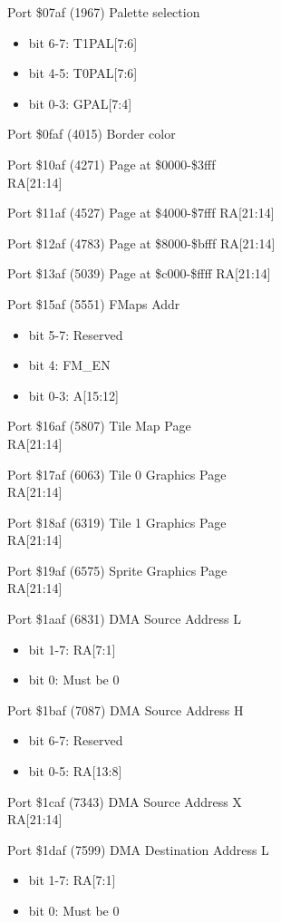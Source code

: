 Port \$07af (1967) Palette selection
\begin{itemize}
\item[] bit 6-7: T1PAL[7:6]
\item[] bit 4-5: T0PAL[7:6]
\item[] bit 0-3: GPAL[7:4]
\end{itemize}

Port \$0faf (4015) Border color

Port \$10af (4271) Page at \$0000-\$3fff\\
RA[21:14]

Port \$11af (4527) Page at \$4000-\$7fff
RA[21:14]

Port \$12af (4783) Page at \$8000-\$bfff
RA[21:14]

Port \$13af (5039) Page at \$c000-\$ffff
RA[21:14]

Port \$15af (5551) FMaps Addr
\begin{itemize}
\item[] bit 5-7: Reserved
\item[] bit 4: FM\_EN
\item[] bit 0-3: A[15:12]  
\end{itemize}

Port \$16af (5807) Tile Map Page\\
RA[21:14]

Port \$17af (6063) Tile 0 Graphics Page\\
RA[21:14]

Port \$18af (6319) Tile 1 Graphics Page\\
RA[21:14]

Port \$19af (6575) Sprite Graphics Page\\
RA[21:14]

Port \$1aaf (6831) DMA Source Address L
\begin{itemize}
\item[] bit 1-7: RA[7:1]
\item[] bit 0: Must be 0
\end{itemize}

Port \$1baf (7087) DMA Source Address H
\begin{itemize}
\item[] bit 6-7: Reserved
\item[] bit 0-5: RA[13:8]
\end{itemize}

Port \$1caf (7343) DMA Source Address X\\
RA[21:14]

Port \$1daf (7599) DMA Destination Address L
\begin{itemize}
\item[] bit 1-7: RA[7:1]
\item[] bit 0: Must be 0
\end{itemize}

